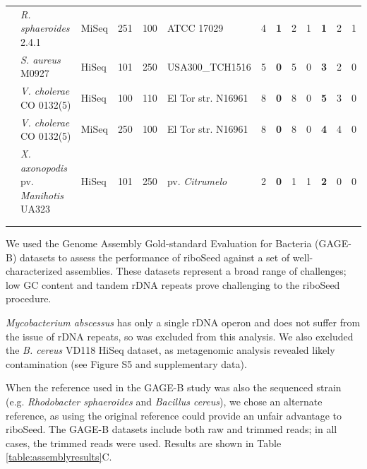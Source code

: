 \documentclass[a4,center,fleqn]{NAR}
\begin{document}
\begin{table}[!hb]
\begin{tabular}{p{.3cm}p{5.2cm}p{.95cm}p{.75cm}p{.75cm}p{2.63cm}p{.6cm}>{\hfill}p{.4cm}p{.2cm}p{.1cm}>{\hfill}p{.4cm}p{.2cm}p{.1cm}}
    & \textit{R. sphaeroides} 2.4.1 & MiSeq & 251 & 100 & ATCC 17029  & 4 & \textbf{1} & 2 & 1  & \textbf{1} & 2 & 1  \\

    & \textit{S. aureus} M0927 & HiSeq & 101 & 250 & USA300\_TCH1516 & 5 & \textbf{0} & 5 & 0  & \textbf{3} & 2 & 0  \\

    & \textit{V. cholerae} CO 0132(5) & HiSeq & 100 & 110 & El Tor str. N16961  & 8 & \textbf{0} & 8 & 0  & \textbf{5} & 3 & 0  \\

    & \textit{V. cholerae} CO 0132(5) & MiSeq   & 250   & 100   & El Tor str. N16961 & 8 & \textbf{0} & 8 & 0  & \textbf{4} & 4 & 0  \\

    & \textit{X. axonopodis} pv. \textit{Manihotis} UA323 & HiSeq   & 101   & 250   & pv. \textit{Citrumelo} & 2 & \textbf{0} & 1 & 1  & \textbf{2} & 0 & 0 \\

    \botrule
    \begin{minipage}[t]{.5\textwidth}
      {\tiny
        $\checkmark$  correct assembly; --  unnassembled; $\times$  incorrect assembly\\
      }
    \end{minipage}
  \end{tabular}
\end{table}




We used the Genome Assembly Gold-standard Evaluation for Bacteria (GAGE-B) datasets \cite{Magoc2013} to assess the performance of riboSeed against a set of well-characterized assemblies. These datasets represent a broad range of challenges; low GC content and tandem rDNA repeats prove challenging to the riboSeed procedure.

\textit{Mycobacterium abscessus} has only a single rDNA operon and does not suffer from the issue of rDNA repeats, so was excluded from this analysis.  We also excluded the \textit{B. cereus} VD118 HiSeq dataset, as metagenomic analysis revealed likely contamination (see Figure S5 and supplementary data).

When the reference used in the GAGE-B study was also the sequenced strain (e.g. \textit{Rhodobacter sphaeroides}  and  \textit{Bacillus cereus}), we chose an alternate reference, as using the original reference could provide an unfair advantage to riboSeed. The GAGE-B datasets include both raw and trimmed reads; in all cases, the trimmed reads were used. Results are shown in Table \ref{table:assemblyresults}C.
\end{document}
